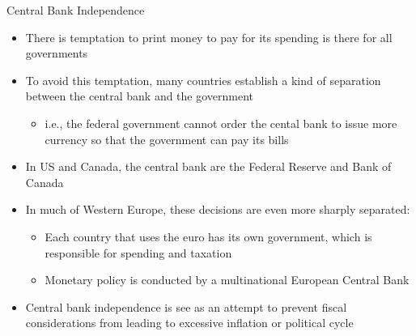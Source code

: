 \documentclass[aspectratio=1610]{beamer}
\begin{document}
\begin{frame}[wide]{Central Bank Independence}
	\begin{itemize}
		\item There is temptation to print money to pay for its spending is there for all governments
		\item To avoid this temptation, many countries establish a kind of separation  between the central bank and the government
		\begin{itemize}
			\item i.e., the federal government cannot order the cental bank to issue more currency so that the government can pay its bills
		\end{itemize}
		\item In US and Canada, the central bank are the Federal Reserve and Bank of Canada
		\item In much of Western Europe, these decisions are even more sharply separated: 
		\begin{itemize}
			\item Each country that uses the euro has its own government, which is responsible for spending and taxation
			\item Monetary policy is conducted by a multinational European Central Bank
		\end{itemize}
		\item Central bank independence is see as an attempt to prevent fiscal considerations from leading to excessive inflation or political cycle
		
	\end{itemize}
\end{frame}
\end{document}
